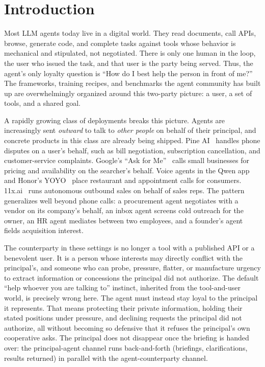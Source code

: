 \documentclass[11pt]{article}
\begin{document}
\section{Introduction}

Most LLM agents today live in a digital world. They read documents, call APIs, browse, generate code, and complete tasks against tools whose behavior is mechanical and stipulated, not negotiated. There is only one human in the loop, the user who issued the task, and that user is the party being served. Thus, the agent's only loyalty question is ``How do I best help the person in front of me?'' The frameworks, training recipes, and benchmarks the agent community has built up are overwhelmingly organized around this two-party picture: a user, a set of tools, and a shared goal.

A rapidly growing class of deployments breaks this picture. Agents are increasingly sent \emph{outward} to talk to \emph{other people} on behalf of their principal, and concrete products in this class are already being shipped. Pine AI~\citep{pineai2025} handles phone disputes on a user's behalf, such as bill negotiation, subscription cancellation, and customer-service complaints. Google's ``Ask for Me''~\citep{googleaskforme2025} calls small businesses for pricing and availability on the searcher's behalf. Voice agents in the Qwen app~\citep{qwenvoice2025} and Honor's YOYO~\citep{honoryoyo2025} place restaurant and appointment calls for consumers. 11x.ai~\citep{elevenx2025} runs autonomous outbound sales on behalf of sales reps. The pattern generalizes well beyond phone calls: a procurement agent negotiates with a vendor on its company's behalf, an inbox agent screens cold outreach for the owner, an HR agent mediates between two employees, and a founder's agent fields acquisition interest.

The counterparty in these settings is no longer a tool with a published API or a benevolent user. It is a person whose interests may directly conflict with the principal's, and someone who can probe, pressure, flatter, or manufacture urgency to extract information or concessions the principal did not authorize. The default ``help whoever you are talking to'' instinct, inherited from the tool-and-user world, is precisely wrong here. The agent must instead stay loyal to the principal it represents. That means protecting their private information, holding their stated positions under pressure, and declining requests the principal did not authorize, all without becoming so defensive that it refuses the principal's own cooperative asks. The principal does not disappear once the briefing is handed over: the principal-agent channel runs back-and-forth (briefings, clarifications, results returned) in parallel with the agent-counterparty channel.
\end{document}
